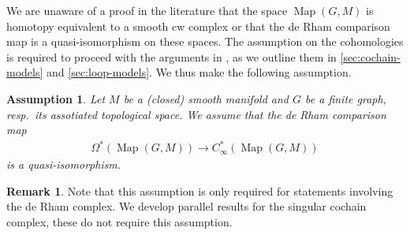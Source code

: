 \documentclass{scrartcl}
\theoremstyle{plain}
\newtheorem{assumption}[theorem]{Assumption}
\theoremstyle{definition}
\newtheorem{remark}[theorem]{Remark}
\DeclareMathOperator{\Map}{Map}
\begin{document}
We are unaware of a proof in the literature that the space $\Map(G, M)$ is homotopy equivalent to a smooth cw complex or that the de Rham comparison map is a quasi-isomorphism on these spaces. The assumption on the cohomologies is required to proceed with the arguments in \cite{naef2019string}, as we outline them in \cref{sec:cochain-models} and \cref{sec:loop-models}. We thus make the following assumption. 

\begin{assumption}\label{assumption}
    Let $M$ be a (closed) smooth manifold and $G$ be a finite graph, resp.~its assotiated topological space. We assume that the de Rham comparison map
    \begin{align*}
        \Omega^*(\Map(G, M)) \to C_\infty^*(\Map(G, M)) 
    \end{align*}
    is a quasi-isomorphism. 
\end{assumption}
\begin{remark}
Note that this assumption is only required for statements involving the de Rham complex. We develop parallel results for the singular cochain complex, these do not require this assumption. 
\end{remark}
\end{document}
